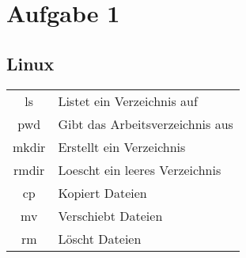 \section{Aufgabe 1}
\subsection{Linux}
\begin{tabular}[h!]{cl}
  ls     & Listet ein Verzeichnis auf \\
  pwd    & Gibt das Arbeitsverzeichnis aus \\
  mkdir  & Erstellt ein Verzeichnis \\
  rmdir  & Loescht ein leeres Verzeichnis \\
  cp     & Kopiert Dateien \\
  mv     & Verschiebt Dateien \\
  rm     & Löscht Dateien
\end{tabular}
